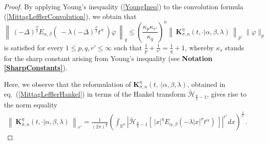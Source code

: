 \documentclass{amsart}
\theoremstyle{definition}
\theoremstyle{remark}
\numberwithin{equation}{section}
\newcommand{\BR}{{\mathbb R}}
\begin{document}
\begin{proof}
	By applying Young's inequality (\ref{YoungIneq}) to the convolution formula (\ref{MittagLefflerConvolution}), we obtain that
	$$
	\left\|~ (-\Delta)^{\frac{\eta}{2}}E_{\alpha,\beta}\left(~-\lambda(-\Delta)^{\frac{\sigma}{2}} t^\alpha~\right)\varphi~\right\|_q \leq \left(\frac{\kappa_p\kappa_{r'}}{\kappa_q}\right)^n\left\| ~{\bm K}_{\sigma,n}^\eta(t,\cdot|\alpha,\beta,\lambda)~\right\|_{p'}~\|\varphi \|_p 
	$$
	is satisfied for every $1\leq p,q,r'\leq \infty$ such that $\displaystyle \frac{1}{p}+\frac{1}{r'}=\frac{1}{q}+1$, whereby $\displaystyle \kappa_s$ stands for the sharp constant arising from Young's inequality (see {\bf Notation \ref{SharpConstants}}).
	
	Here, we observe that the reformulation of ${\bm K}_{\sigma,n}^\eta(t,\cdot|\alpha,\beta,\lambda)$, obtained in eq.~(\ref{MittagLefflerHankel}) in terms of the Hankel transform $\widetilde{\mathcal{H}}_{\frac{n}{2}-1}$, gives rise to the norm equality
	\begin{eqnarray*}
		\left\| ~{\bm K}_{\sigma,n}^\eta(t,\cdot|\alpha,\beta,\lambda)~\right\|_{r'}=\frac{1}{(2\pi)^{\frac{n}{2}}}\left(\int_{\BR^n}\left|\widetilde{\mathcal{H}}_{\frac{n}{2}-1}\left[~|x|^\eta E_{\alpha,\beta}\left(-\lambda |x|^\sigma t^{\alpha}\right)~\right]\right|^{r'} dx\right)^{\frac{1}{r'}}.
	\end{eqnarray*}
	

\end{proof}
\end{document}
